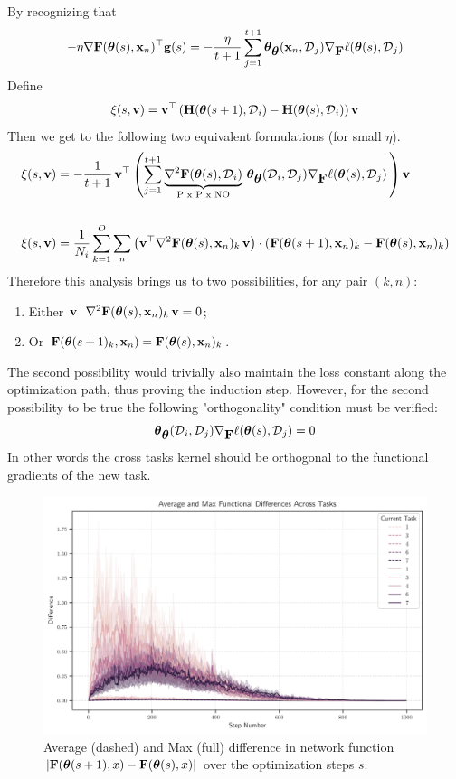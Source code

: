 \documentclass{article} %
\newcommand{\hessian}{\vH}
\begin{document}
By recognizing that 
\begin{equation*}
    -\eta\grad\vF(\vparam(s), \vx_n)^\top\vg(s) = - \frac{\eta}{t+1}\sum_{j=1}^{t+1}\vparam_{\vparam}(\vx_n, \data_{j})\grad_{\vF}\loss(\vparam(s), \data_{j}) 
\end{equation*}
Define 
\[\xi(s, \vv) = \vv^\top \rnd{\hessian(\vparam(s+1), \data_i) - \hessian(\vparam(s), \data_i)}\vv\]
Then we get to the following two equivalent formulations (for small $\eta$). 
\begin{align}
    &\xi(s, \vv) = - \frac{1}{t+1}\,\vv^\top\rnd{  \sum_{j=1}^{t+1} \underbrace{\grad^2\vF(\vparam(s),\data_i)}_\text{P x P x NO} \, \vparam_{\vparam}(\data_i, \data_{j})\grad_{\vF}\loss(\vparam(s), \data_{j})\,}\vv\\
    &\nonumber\\
    &\xi(s, \vv) = \frac{1}{N_i}\sum_{k=1}^O \sum_n\rnd{\vv^\top\grad^2\vF(\vparam(s),\vx_n)_k\,\vv}\cdot\rnd{\vF(\vparam(s+1), \vx_{n})_k-\vF(\vparam(s), \vx_n)_k}
\end{align}
Therefore this analysis brings us to two possibilities, for any pair $(k,n)$: 
\begin{enumerate}
    \item Either $\vv^\top\grad^2\vF(\vparam(s),\vx_n)_{k}\,\vv = 0$; 
    \item Or $\vF(\vparam(s+1)_{k}, \vx_{n}) = \vF(\vparam(s), \vx_{n})_{k}$.
\end{enumerate}
The second possibility would trivially also maintain the loss constant along the optimization path, thus proving the induction step.  However, for the second possibility to be true the following "orthogonality" condition must be verified:
\begin{equation}
\label{eq:ortho-condition}
     \vparam_{\vparam}(\data_i, \data_{j})\grad_{\vF}\loss(\vparam(s), \data_{j}) = 0
\end{equation}
In other words the cross tasks kernel should be orthogonal to the functional gradients of the new task. 
\begin{figure}
    \centering
    \includegraphics[width=0.7\linewidth]{figures/functional_differences_all_tasks_olddata.pdf}
    \caption{Average (dashed) and Max (full) difference in network function $|\vF(\vparam(s+1),x) - \vF(\vparam(s),x)|$ over the optimization steps $s$. }
    \label{fig:func_diff}
\end{figure}
\end{document}
